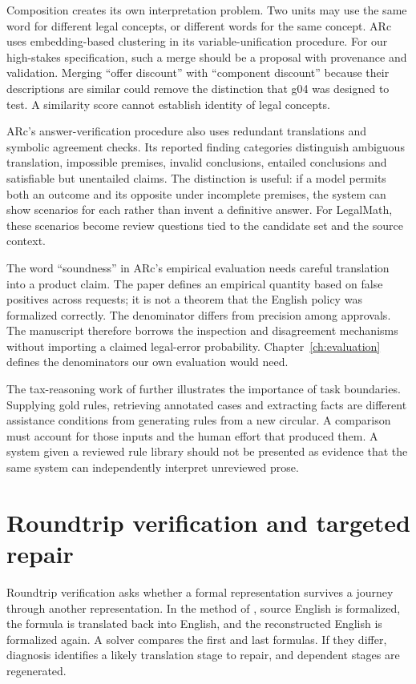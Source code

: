 \documentclass[12pt,a4paper,oneside,openany]{book}
\begin{document}
Composition creates its own interpretation problem. Two units may use the same
word for different legal concepts, or different words for the same concept.
ARc uses embedding-based clustering in its variable-unification procedure.
For our high-stakes specification, such a merge should be a proposal with
provenance and validation. Merging ``offer discount'' with ``component
discount'' because their descriptions are similar could remove the distinction
that g04 was designed to test. A similarity score cannot establish identity
of legal concepts.

ARc's answer-verification procedure also uses redundant translations and
symbolic agreement checks. Its reported finding categories distinguish
ambiguous translation, impossible premises, invalid conclusions, entailed
conclusions and satisfiable but unentailed claims. The distinction is useful:
if a model permits both an outcome and its opposite under incomplete premises,
the system can show scenarios for each rather than invent a definitive answer.
For LegalMath, these scenarios become review questions tied to the candidate
set and the source context.

The word ``soundness'' in ARc's empirical evaluation needs careful translation
into a product claim. The paper defines an empirical quantity based on false
positives across requests; it is not a theorem that the English policy was
formalized correctly. The denominator differs from precision among approvals.
The manuscript therefore borrows the inspection and disagreement mechanisms
without importing a claimed legal-error probability. Chapter~\ref{ch:evaluation}
defines the denominators our own evaluation would need.

The tax-reasoning work of \citet{jurayj2026} further illustrates the importance
of task boundaries. Supplying gold rules, retrieving annotated cases and
extracting facts are different assistance conditions from generating rules
from a new circular. A comparison must account for those inputs and the human
effort that produced them. A system given a reviewed rule library should not
be presented as evidence that the same system can independently interpret
unreviewed prose.

\section{Roundtrip verification and targeted repair}
\label{sec:languages-roundtrip}
Roundtrip verification asks whether a formal representation survives a journey
through another representation. In the method of \citet{roundtrip2026}, source
English is formalized, the formula is translated back into English, and the
reconstructed English is formalized again. A solver compares the first and
last formulas. If they differ, diagnosis identifies a likely translation
stage to repair, and dependent stages are regenerated.
\end{document}
